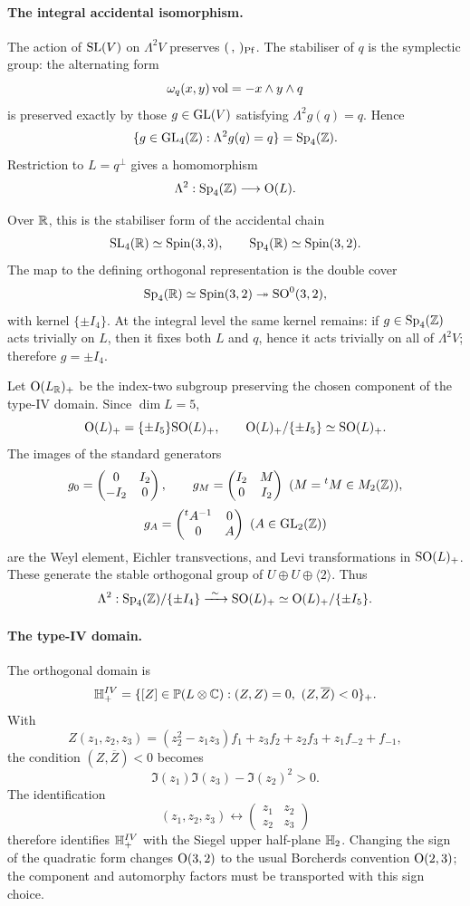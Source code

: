 \paragraph{The integral accidental isomorphism.}
The action of \(\mathrm{SL}(V)\) on \(\Lambda^2V\) preserves
\((\, ,\,)_{\mathrm{Pf}}\).  The stabiliser of \(q\) is the symplectic group:
the alternating form
\[
  \omega_q(x,y)\operatorname{vol}=-x\wedge y\wedge q
\]
is preserved exactly by those \(g\in\mathrm{GL}(V)\) satisfying
\(\Lambda^2g(q)=q\).  Hence
\[
  \{g\in\mathrm{GL}_4(\mathbb{Z}):\Lambda^2g(q)=q\}=\mathrm{Sp}_4(\mathbb{Z}).
\]
Restriction to \(L=q^\perp\) gives a homomorphism
\[
  \Lambda^2:\mathrm{Sp}_4(\mathbb{Z})\longrightarrow \mathrm{O}(L).
\]

Over \(\mathbb{R}\), this is the stabiliser form of the accidental chain
\[
  \mathrm{SL}_4(\mathbb{R})\simeq \mathrm{Spin}(3,3),\qquad
  \mathrm{Sp}_4(\mathbb{R})\simeq \mathrm{Spin}(3,2).
\]
The map to the defining orthogonal representation is the double cover
\[
  \mathrm{Sp}_4(\mathbb{R})\simeq\mathrm{Spin}(3,2)\twoheadrightarrow \mathrm{SO}^0(3,2),
\]
with kernel \(\{\pm I_4\}\).  At the integral level the same kernel
remains: if \(g\in\mathrm{Sp}_4(\mathbb{Z})\) acts trivially on \(L\), then it fixes
both \(L\) and \(q\), hence it acts trivially on all of \(\Lambda^2V\);
therefore \(g=\pm I_4\).

Let \(\mathrm{O}(L_{\mathbb{R}})_+\) be the index-two subgroup preserving the chosen
component of the type-IV domain.  Since \(\dim L=5\),
\[
  \mathrm{O}(L)_+=\{\pm I_5\}\mathrm{SO}(L)_+,\qquad
  \mathrm{O}(L)_+/\{\pm I_5\}\simeq \mathrm{SO}(L)_+.
\]
The images of the standard generators
\[
g_0=
\begin{pmatrix}
0&I_2\\ -I_2&0
\end{pmatrix},\qquad
g_M=
\begin{pmatrix}
I_2&M\\ 0&I_2
\end{pmatrix}\ (M={}^tM\in M_2(\mathbb{Z})),
\]
\[
g_A=
\begin{pmatrix}
{}^tA^{-1}&0\\ 0&A
\end{pmatrix}\ (A\in\mathrm{GL}_2(\mathbb{Z}))
\]
are the Weyl element, Eichler transvections, and Levi transformations
in \(\mathrm{SO}(L)_+\).  These generate the stable orthogonal group of
\(U\oplus U\oplus\langle 2\rangle\).  Thus
\[
  \Lambda^2:\mathrm{Sp}_4(\mathbb{Z})/\{\pm I_4\}
  \xrightarrow{\ \sim\ }
  \mathrm{SO}(L)_+
  \simeq
  \mathrm{O}(L)_+/\{\pm I_5\}.
\]

\paragraph{The type-IV domain.}
The orthogonal domain is
\[
  \mathbb{H}^{IV}_+
  =
  \{[Z]\in\mathbb P(L\otimes\mathbb{C}):(Z,Z)=0,\ (Z,\overline Z)<0\}_+ .
\]
With
\[
Z(z_1,z_2,z_3)
 =
(z_2^2-z_1z_3)f_1+z_3f_2+z_2f_3+z_1f_{-2}+f_{-1},
\]
the condition \((Z,\overline Z)<0\) becomes
\[
  \Im(z_1)\Im(z_3)-\Im(z_2)^2>0.
\]
The identification
\[
  (z_1,z_2,z_3)\longleftrightarrow
  \begin{pmatrix}z_1&z_2\\ z_2&z_3\end{pmatrix}
\]
therefore identifies \(\mathbb{H}^{IV}_+\) with the Siegel upper half-plane
\(\mathbb{H}_2\).  Changing the sign of the quadratic form changes
\(\mathrm{O}(3,2)\) to the usual Borcherds convention \(\mathrm{O}(2,3)\); the
component and automorphy factors must be transported with this sign
choice.

